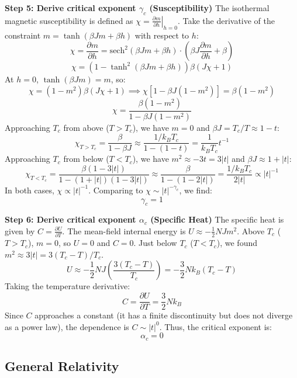 \begin{solution}
\textbf{Step 5: Derive critical exponent $\gamma_c$ (Susceptibility)}
The isothermal magnetic susceptibility is defined as $\chi = \left. \frac{\partial m}{\partial h} \right|_{h=0}$.
Take the derivative of the constraint $m = \tanh(\beta J m + \beta h)$ with respect to $h$:
\[ \chi = \frac{\partial m}{\partial h} = \text{sech}^2(\beta J m + \beta h) \cdot \left( \beta J \frac{\partial m}{\partial h} + \beta \right) \]
\[ \chi = (1 - \tanh^2(\beta J m + \beta h)) \beta (J \chi + 1) \]
At $h = 0$, $\tanh(\beta J m) = m$, so:
\[ \chi = (1 - m^2) \beta (J \chi + 1) \implies \chi [1 - \beta J (1 - m^2)] = \beta(1 - m^2) \]
\[ \chi = \frac{\beta(1 - m^2)}{1 - \beta J(1 - m^2)} \]
Approaching $T_c$ from above ($T > T_c$), we have $m = 0$ and $\beta J = T_c/T \approx 1 - t$:
\[ \chi_{T>T_c} = \frac{\beta}{1 - \beta J} \approx \frac{1/k_B T_c}{1 - (1 - t)} = \frac{1}{k_B T_c} t^{-1} \]
Approaching $T_c$ from below ($T < T_c$), we have $m^2 \approx -3t = 3|t|$ and $\beta J \approx 1 + |t|$:
\[ \chi_{T<T_c} = \frac{\beta(1 - 3|t|)}{1 - (1+|t|)(1 - 3|t|)} \approx \frac{\beta}{1 - (1 - 2|t|)} = \frac{1/k_B T_c}{2|t|} \propto |t|^{-1} \]
In both cases, $\chi \propto |t|^{-1}$. Comparing to $\chi \sim |t|^{-\gamma_c}$, we find:
\[ \gamma_c = 1 \]

\textbf{Step 6: Derive critical exponent $\alpha_c$ (Specific Heat)}
The specific heat is given by $C = \frac{\partial U}{\partial T}$. The mean-field internal energy is $U \approx -\frac{1}{2} N J m^2$.
Above $T_c$ ($T > T_c$), $m = 0$, so $U = 0$ and $C = 0$.
Just below $T_c$ ($T < T_c$), we found $m^2 \approx 3|t| = 3(T_c - T) / T_c$.
\[ U \approx -\frac{1}{2} N J \left( \frac{3(T_c - T)}{T_c} \right) = -\frac{3}{2} N k_B (T_c - T) \]
Taking the temperature derivative:
\[ C = \frac{\partial U}{\partial T} = \frac{3}{2} N k_B \]
Since $C$ approaches a constant (it has a finite discontinuity but does not diverge as a power law), the dependence is $C \sim |t|^0$.
Thus, the critical exponent is:
\[ \alpha_c = 0 \]
\end{solution}

\subsection{General Relativity}


